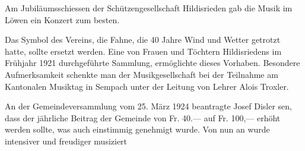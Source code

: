 \begin{history}
    Am Jubiläumsschiessen der Schützengesellschaft Hildisrieden gab die Musik im
    Löwen ein Konzert zum besten.

    Das Symbol des Vereins, die Fahne, die 40 Jahre Wind und Wetter getrotzt
    hatte, sollte ersetzt werden. Eine von Frauen und Töchtern Hildisriedens im
    Frühjahr 1921 durchgeführte Sammlung, ermöglichte dieses Vorhaben. Besondere
    Aufmerksamkeit schenkte man der Musikgesellschaft bei der Teilnahme am
    Kantonalen Musiktag in Sempach unter der Leitung von Lehrer Alois Troxler.

    An der Gemeindeversammlung vom 25. März 1924 beantragte Josef Disler sen,
    dass der jährliche Beitrag der Gemeinde von Fr. 40.— auf Fr. 100,— erhöht
    werden sollte, was auch einstimmig genehmigt wurde. Von nun an wurde
    intensiver und freudiger musiziert


\end{history}
